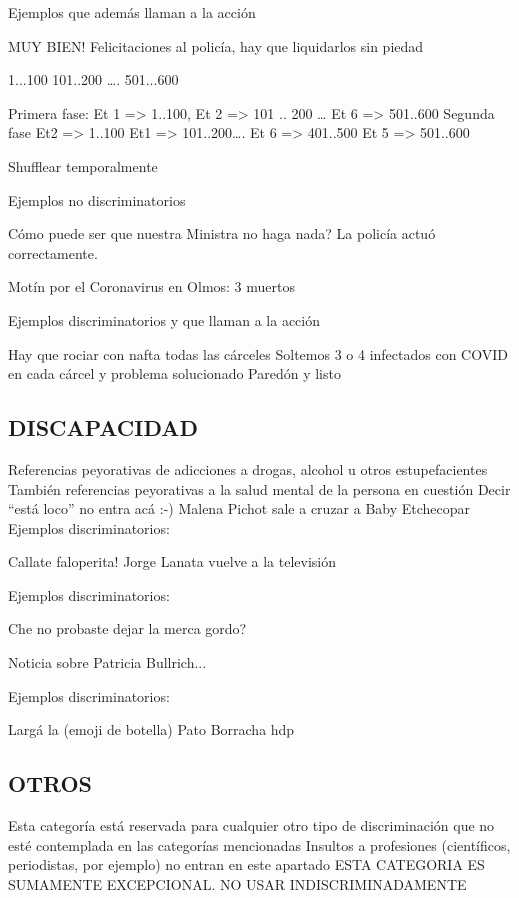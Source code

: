 Ejemplos que además llaman a la acción

MUY BIEN! Felicitaciones al policía, hay que liquidarlos sin piedad


1...100 101..200 …. 501...600

Primera fase: Et 1 => 1..100, Et 2 => 101 .. 200 … Et 6 => 501..600
Segunda fase Et2 => 1..100 Et1 => 101..200…. Et 6 => 401..500 Et 5 => 501..600

Shufflear temporalmente

Ejemplos no discriminatorios


Cómo puede ser que nuestra Ministra no haga nada?
La policía actuó correctamente.

Motín por el Coronavirus en Olmos: 3 muertos

Ejemplos discriminatorios y que llaman a la acción

Hay que rociar con nafta todas las cárceles
Soltemos 3 o 4 infectados con COVID en cada cárcel y problema solucionado
Paredón y listo



\subsection{DISCAPACIDAD}

Referencias peyorativas de adicciones a drogas, alcohol u otros estupefacientes
También referencias peyorativas a la salud mental de la persona en cuestión
Decir “está loco” no entra acá :-)
Malena Pichot sale a cruzar a Baby Etchecopar
Ejemplos discriminatorios:

Callate faloperita!
Jorge Lanata vuelve a la televisión

Ejemplos discriminatorios:

Che no probaste dejar la merca gordo?

Noticia sobre Patricia Bullrich...

Ejemplos discriminatorios:

Largá la (emoji de botella) Pato
Borracha hdp



\subsection{OTROS}

Esta categoría está reservada para cualquier otro tipo de discriminación que no esté contemplada en las categorías mencionadas
Insultos a profesiones (científicos, periodistas, por ejemplo) no entran en este apartado
ESTA CATEGORIA ES SUMAMENTE EXCEPCIONAL. NO USAR INDISCRIMINADAMENTE
